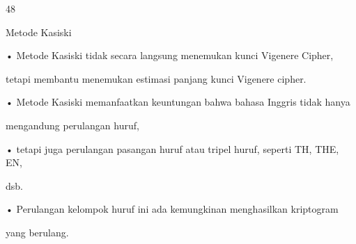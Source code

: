 \documentclass{article}
\begin{document}

48

Metode Kasiski

• Metode Kasiski tidak secara langsung menemukan kunci Vigenere Cipher, 

tetapi membantu menemukan estimasi panjang kunci Vigenere cipher.

• Metode Kasiski memanfaatkan keuntungan bahwa bahasa Inggris tidak hanya 

mengandung perulangan huruf,

• tetapi juga perulangan pasangan huruf atau tripel huruf, seperti TH, THE, EN,  

dsb.

• Perulangan kelompok huruf ini ada kemungkinan menghasilkan kriptogram 

yang berulang.
\end{document}
